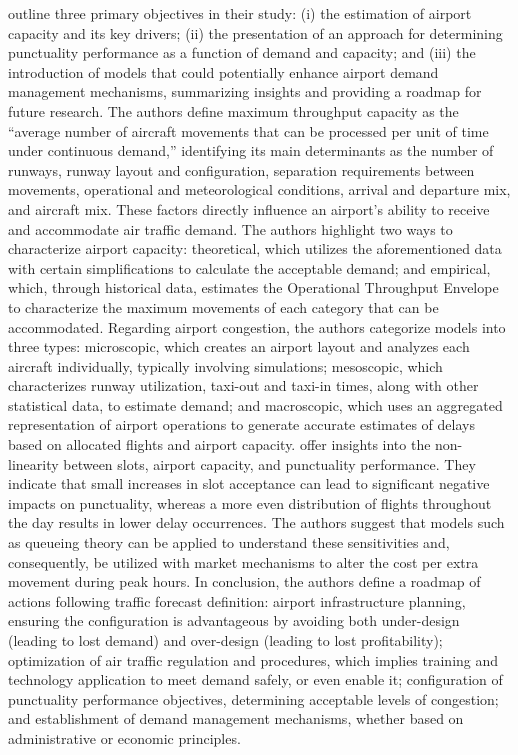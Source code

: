  outline three primary objectives in their study: (i) the estimation of airport capacity and its key drivers; (ii) the presentation of an approach for determining punctuality performance as a function of demand and capacity; and (iii) the introduction of models that could potentially enhance airport demand management mechanisms, summarizing insights and providing a roadmap for future research. The authors define maximum throughput capacity as the “average number of aircraft movements that can be processed per unit of time under continuous demand,” identifying its main determinants as the number of runways, runway layout and configuration, separation requirements between movements, operational and meteorological conditions, arrival and departure mix, and aircraft mix. These factors directly influence an airport's ability to receive and accommodate air traffic demand. The authors highlight two ways to characterize airport capacity: theoretical, which utilizes the aforementioned data with certain simplifications to calculate the acceptable demand; and empirical, which, through historical data, estimates the Operational Throughput Envelope to characterize the maximum movements of each category that can be accommodated. Regarding airport congestion, the authors categorize models into three types: microscopic, which creates an airport layout and analyzes each aircraft individually, typically involving simulations; mesoscopic, which characterizes runway utilization, taxi-out and taxi-in times, along with other statistical data, to estimate demand; and macroscopic, which uses an aggregated representation of airport operations to generate accurate estimates of delays based on allocated flights and airport capacity.  offer insights into the non-linearity between slots, airport capacity, and punctuality performance. They indicate that small increases in slot acceptance can lead to significant negative impacts on punctuality, whereas a more even distribution of flights throughout the day results in lower delay occurrences. The authors suggest that models such as queueing theory can be applied to understand these sensitivities and, consequently, be utilized with market mechanisms to alter the cost per extra movement during peak hours. In conclusion, the authors define a roadmap of actions following traffic forecast definition: airport infrastructure planning, ensuring the configuration is advantageous by avoiding both under-design (leading to lost demand) and over-design (leading to lost profitability); optimization of air traffic regulation and procedures, which implies training and technology application to meet demand safely, or even enable it; configuration of punctuality performance objectives, determining acceptable levels of congestion; and establishment of demand management mechanisms, whether based on administrative or economic principles.

